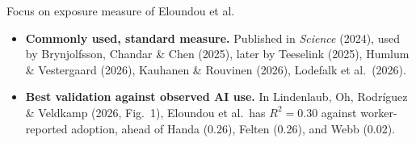 
\begin{frame}{Focus on exposure measure of Eloundou et al.}
\hypertarget{after-eloundou}{}
\begin{itemize}\setlength{\itemsep}{10pt}
  \item \textbf{Commonly used, standard measure.} Published in \textit{Science} (2024), used by Brynjolfsson, Chandar \& Chen (2025), later by Teeselink (2025), Humlum \& Vestergaard (2026), Kauhanen \& Rouvinen (2026), Lodefalk et al.\ (2026).
  \item \textbf{Best validation against observed AI use.} In Lindenlaub, Oh, Rodríguez \& Veldkamp (2026, Fig.\ 1), Eloundou et al.\ has $R^2 = 0.30$ against worker-reported adoption, ahead of Handa (0.26), Felten (0.26), and Webb (0.02).
\end{itemize}

\vspace{1.2em}
\hfill\hyperlink{lorv-detail}{}
\end{frame}
